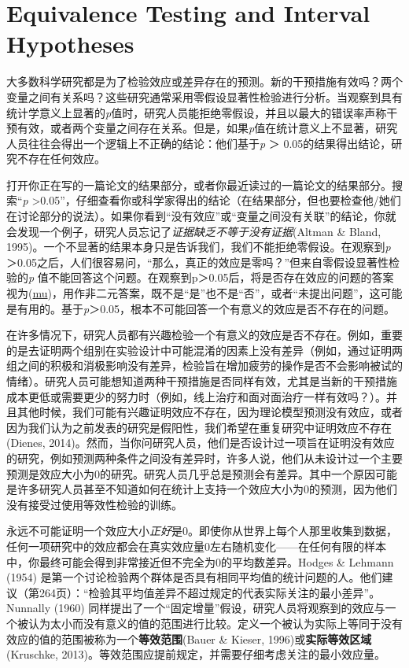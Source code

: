 \documentclass[
  letterpaper,
  DIV=11,
  numbers=noendperiod]{scrreprt}
\begin{document}

\hypertarget{sec-equivalencetest}{%
\chapter{Equivalence Testing and Interval
Hypotheses}\label{sec-equivalencetest}}

大多数科学研究都是为了检验效应或差异存在的预测。新的干预措施有效吗？两个变量之间有关系吗？这些研究通常采用零假设显著性检验进行分析。当观察到具有统计学意义上显著的\emph{p}值时，研究人员能拒绝零假设，并且以最大的错误率声称干预有效，或者两个变量之间存在关系。但是，如果\emph{p}值在统计意义上不显著，研究人员往往会得出一个逻辑上不正确的结论：他们基于\emph{p}
＞ 0.05的结果得出结论，研究不存在任何效应。

打开你正在写的一篇论文的结果部分，或者你最近读过的一篇论文的结果部分。搜索``\emph{p}
\textgreater0.05''，仔细查看你或科学家得出的结论（在结果部分，但也要检查他/她们在讨论部分的说法）。如果你看到``没有效应''或``变量之间没有关联''的结论，你就会发现一个例子，研究人员忘记了\emph{证据缺乏不等于没有证据}(Altman
\& Bland,
1995)。一个不显著的结果本身只是告诉我们，我们不能拒绝零假设。在观察到\emph{p}
＞0.05之后，人们很容易问，``那么，真正的效应是零吗？''但来自零假设显著性检验的\emph{p}
值不能回答这个问题。在观察到p＞0.05后，将是否存在效应的问题的答案视为(\href{https://en.wikipedia.org/wiki/Mu_(negative)\#Non-dualistic_meaning}{mu})，用作非二元答案，既不是``是''也不是``否''，或者``未提出问题''，这可能是有用的。基于\emph{p}＞0.05，根本不可能回答一个有意义的效应是否不存在的问题。

在许多情况下，研究人员都有兴趣检验一个有意义的效应是否不存在。例如，重要的是去证明两个组别在实验设计中可能混淆的因素上没有差异（例如，通过证明两组之间的积极和消极影响没有差异，检验旨在增加疲劳的操作是否不会影响被试的情绪）。研究人员可能想知道两种干预措施是否同样有效，尤其是当新的干预措施成本更低或需要更少的努力时（例如，线上治疗和面对面治疗一样有效吗？）。并且其他时候，我们可能有兴趣证明效应不存在，因为理论模型预测没有效应，或者因为我们认为之前发表的研究是假阳性，我们希望在重复研究中证明效应不存在(Dienes,
2014)。然而，当你问研究人员，他们是否设计过一项旨在证明没有效应的研究，例如预测两种条件之间没有差异时，许多人说，他们从未设计过一个主要预测是效应大小为0的研究。研究人员几乎总是预测会有差异。其中一个原因可能是许多研究人员甚至不知道如何在统计上支持一个效应大小为0的预测，因为他们没有接受过使用等效性检验的训练。

永远不可能证明一个效应大小\emph{正好}是0。即使你从世界上每个人那里收集到数据，任何一项研究中的效应都会在真实效应量0左右随机变化------在任何有限的样本中，你最终可能会得到非常接近但不完全为0的平均数差异。Hodges
\& Lehmann (1954)
是第一个讨论检验两个群体是否具有相同平均值的统计问题的人。他们建议（第264页）：``检验其平均值差异不超过规定的代表实际关注的最小差异''。Nunnally
(1960)
同样提出了一个``固定增量''假设，研究人员将观察到的效应与一个被认为太小而没有意义的值的范围进行比较。定义一个被认为实际上等同于没有效应的值的范围被称为一个\textbf{等效范围}(Bauer
\& Kieser, 1996)或\textbf{实际等效区域}(Kruschke,
2013)。等效范围应提前规定，并需要仔细考虑关注的最小效应量。
\end{document}
